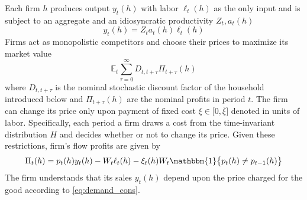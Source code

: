 \documentclass[a4paper,10pt]{article}  %
\begin{document}
Each firm $h$ produces output $y_t(h)$ with labor $\ell_t(h)$ as the only input and is subject to an aggregate
and an idiosyncratic productivity $ Z_t,a_t(h) $
\begin{equation}
   \label{eq:model_eq1}
   y_t(h) = Z_t a_t(h) \ell_t(h)
\end{equation}
Firms act as monopolistic competitors and choose their prices to maximize its market value
\begin{equation}
   \label{eq:model_eq}
   \mathbb{E}_t \sum_{\tau=0}^{\infty} D_{t,t+\tau} \Pi_{t+\tau} (h)
\end{equation}
where $D_{t,t+\tau}$ is the nominal stochastic discount factor of the household introduced below and $\Pi_{t+\tau}
(h) $ are the nominal profits in period $ t $. The firm can change its price only upon payment of fixed cost $ \xi
\in \big[ 0, \bar{\xi} \big] $ denoted in units of labor. Specifically, each period a firm draws a cost from the
time-invariant distribution $ H $ and decides whether or not to change its price. Given these restrictions, firm's
flow profits are given by
\begin{equation}
   \label{eq:model_eq3}
   \Pi_t(h) = p_t(h) y_t(h) - W_t \ell_t(h) - \xi_t(h) W_t \mathbbm{1} \big\{p_t(h) \ne p_{t-1}(h) \big\}
\end{equation}
The firm understands that its sales $ y_t(h) $ depend upon the price charged for the good according to \eqref{eq:demand_cons}. 

\end{document}

